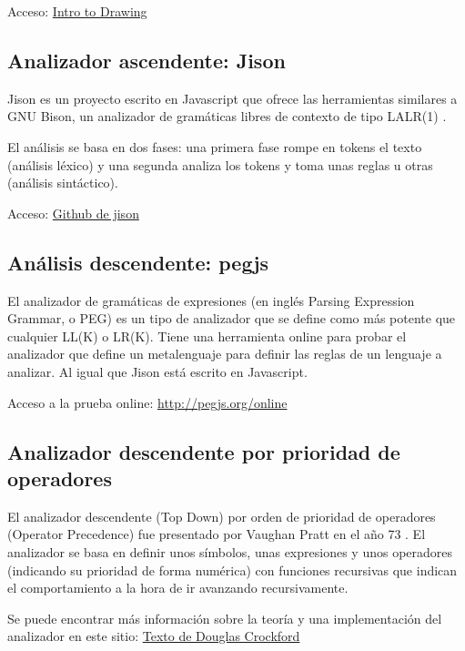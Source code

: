 \documentclass{report}
\begin{document}
	\vspace{10px}
	
	Acceso: 
	\href{https://es.khanacademy.org/computing/hour-of-code/hour-of-code-tutorial/p/intro-to-drawing}{Intro to Drawing}
	
	\subsection{Analizador ascendente: Jison}
	
	Jison es un proyecto escrito en Javascript que ofrece las herramientas similares a GNU Bison, un analizador de gramáticas libres de contexto de tipo LALR(1) \cite{bison}.
	
	El análisis se basa en dos fases: una primera fase rompe en tokens el texto (análisis léxico) y una segunda analiza los tokens y toma unas reglas u otras (análisis sintáctico).  
	
	Acceso:
	\href{https://github.com/zaach/jison}{Github de jison}	
	
	\subsection{Análisis descendente: pegjs}
	
	El analizador de gramáticas de expresiones\cite{peg} (en inglés Parsing Expression Grammar, o PEG) es un tipo de analizador que se define como más potente que cualquier LL(K) o LR(K)\cite{pegjs}. Tiene una herramienta online para probar el analizador que define un metalenguaje para definir las reglas de un lenguaje a analizar. Al igual que Jison está escrito en Javascript.
	
	Acceso a la prueba online:
	\href{http://pegjs.org/online}{http://pegjs.org/online}
	
	\subsection{Analizador descendente por prioridad de operadores}
	
	El analizador descendente (Top Down) por orden de prioridad de operadores (Operator Precedence) fue presentado por Vaughan Pratt en el año 73 \cite{acmtdop}. El analizador se basa en definir unos símbolos, unas expresiones y unos operadores (indicando su prioridad de forma numérica) con funciones recursivas que indican el comportamiento a la hora de ir avanzando recursivamente.
	
	Se puede encontrar más información sobre la teoría y una implementación del analizador en este sitio: 
	\href{http://javascript.crockford.com/tdop/tdop.html}{Texto de Douglas Crockford}
		
\end{document}
